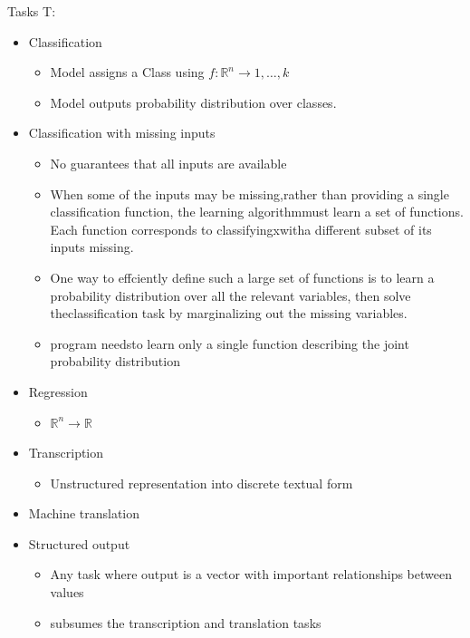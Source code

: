 \documentclass[../Main.tex]{subfiles}
\begin{document}
Tasks T:
\begin{itemize}
    \item Classification 
        \begin{itemize}
            \item Model assigns a Class using \(f : \mathbb{R}^n \to {1,\dots,k}\)
            \item Model outputs probability distribution over classes. 
        \end{itemize}
    \item Classiﬁcation with missing inputs
        \begin{itemize}
            \item No guarantees that all inputs are available
            \item When some of the inputs may be missing,rather than providing a single classiﬁcation function,
            the learning algorithmmust learn a set of functions.
            Each function corresponds to classifyingxwitha diﬀerent subset of its inputs missing.
            \item One way to effciently deﬁne such a large set of functions is to learn a probability distribution
            over all the relevant variables, then solve theclassiﬁcation task by
            marginalizing out the missing variables.
            \item program needsto learn only a single function describing the joint probability distribution
        \end{itemize}
    \item Regression
        \begin{itemize}
            \item \(\mathbb{R}^n \to \mathbb{R}\)
        \end{itemize}
    \item Transcription
        \begin{itemize}
            \item Unstructured representation into discrete textual form
        \end{itemize}
    \item Machine translation
    \item Structured output
        \begin{itemize}
            \item Any task where output is a vector with important relationships between values
            \item subsumes the transcription and translation tasks
        \end{itemize}

\end{itemize}
\end{document}
